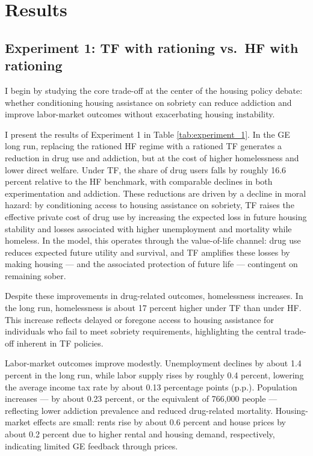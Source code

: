 \documentclass[parskip=full]{article}
\theoremstyle{plain}
\theoremstyle{definition}
\theoremstyle{remark}
\begin{document}
\section{Results}\label{sec:results}

\subsection{Experiment 1: TF with rationing vs.\ HF with rationing}

I begin by studying the core trade-off at the center of the housing policy debate: whether conditioning housing assistance on sobriety can reduce addiction and improve labor-market outcomes without exacerbating housing instability.

I present the results of Experiment 1 in Table \ref{tab:experiment_1}. In the GE long run, replacing the rationed HF regime with a rationed TF generates a reduction in drug use and addiction, but at the cost of higher homelessness and lower direct welfare. Under TF, the share of drug users falls by roughly 16.6 percent relative to the HF benchmark, with comparable declines in both experimentation and addiction. These reductions are driven by a decline in moral hazard: by conditioning access to housing assistance on sobriety, TF raises the effective private cost of drug use by increasing the expected loss in future housing stability and losses associated with higher unemployment and mortality while homeless. In the model, this operates through the value-of-life channel: drug use reduces expected future utility and survival, and TF amplifies these losses by making housing — and the associated protection of future life — contingent on remaining sober.

Despite these improvements in drug-related outcomes, homelessness increases. In the long run, homelessness is about 17 percent higher under TF than under HF. This increase reflects delayed or foregone access to housing assistance for individuals who fail to meet sobriety requirements, highlighting the central trade-off inherent in TF policies.

Labor-market outcomes improve modestly. Unemployment declines by about 1.4 percent in the long run, while labor supply rises by roughly 0.4 percent, lowering the average income tax rate by about 0.13 percentage points (p.p.). Population increases — by about 0.23 percent, or the equivalent of 766,000 people — reflecting lower addiction prevalence and reduced drug-related mortality. Housing-market effects are small: rents rise by about 0.6 percent and house prices by about 0.2 percent due to higher rental and housing demand, respectively, indicating limited GE feedback through prices.
\end{document}
